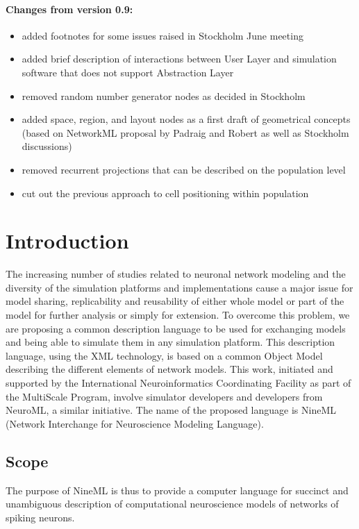\documentclass{article}
\begin{document}
\paragraph{Changes from version 0.9:}
\begin{itemize}
\item added footnotes for some issues raised in Stockholm June meeting
\item added brief description of interactions between User Layer and
simulation software that does not support Abstraction Layer
\item removed random number generator nodes as decided in Stockholm
\item added space, region, and layout nodes as a first draft of geometrical
concepts (based on NetworkML proposal by Padraig and Robert as well as
Stockholm discussions)
\item removed recurrent projections that can be described on the population
level
\item cut out the previous approach to cell positioning within population
\end{itemize}
\newpage

\section{Introduction}

The increasing number of studies related to neuronal network modeling and the diversity of the simulation platforms and implementations cause a major issue for model sharing, replicability and reusability of either whole model or part of the model for further analysis or simply for extension. 
To overcome this problem, we are proposing a common description language to be used for exchanging models and being able to simulate them in any simulation platform. 
This description language, using the XML technology, is based on a common Object Model describing the different elements of network models. This work, initiated and supported by the International Neuroinformatics Coordinating Facility as part of the MultiScale Program, involve simulator developers and developers from NeuroML, a similar initiative. 
The name of the proposed language is NineML (Network Interchange for Neuroscience Modeling Language).

\subsection{Scope}

The purpose of NineML is thus to provide a computer language for
succinct and unambiguous description of computational neuroscience models of
networks of spiking neurons.
\end{document}
